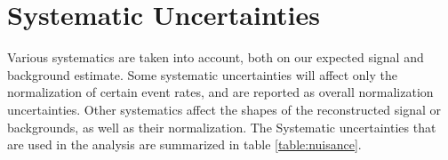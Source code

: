 \clearpage
\newpage
\chapter{Systematic Uncertainties}
\label{sec:systematics}
Various systematics are taken into account, both 
on our expected signal and background estimate. Some systematic uncertainties will affect only the normalization of certain event rates, 
and are reported as overall normalization uncertainties. Other systematics affect the shapes of the reconstructed signal or backgrounds, as well as their normalization.  The
Systematic uncertainties that are used in the analysis are summarized in table \ref{table:nuisance}.%


